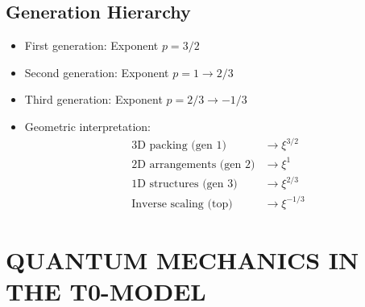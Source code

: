 \documentclass[12pt,a4paper]{article}
\begin{document}
\subsection{Generation Hierarchy}
\begin{itemize}
	\item First generation: Exponent $p = 3/2$
	\item Second generation: Exponent $p = 1 \rightarrow 2/3$
	\item Third generation: Exponent $p = 2/3 \rightarrow -1/3$
	
	\item Geometric interpretation:
	\begin{align*}
		\text{3D packing (gen 1)} &\rightarrow \xi^{3/2}\\
		\text{2D arrangements (gen 2)} &\rightarrow \xi^1\\
		\text{1D structures (gen 3)} &\rightarrow \xi^{2/3}\\
		\text{Inverse scaling (top)} &\rightarrow \xi^{-1/3}
	\end{align*}
\end{itemize}
	\section{QUANTUM MECHANICS IN THE T0-MODEL}
	
\end{document}
